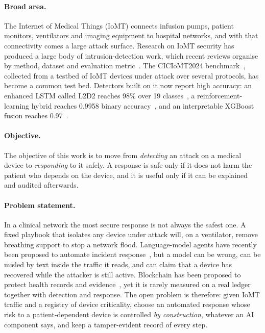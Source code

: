 \documentclass[preprint,12pt]{elsarticle}
\begin{document}
\paragraph{Broad area.}
The Internet of Medical Things (IoMT) connects infusion pumps, patient monitors, ventilators and imaging equipment to hospital networks, and with that connectivity comes a large attack surface. Research on IoMT security has produced a large body of intrusion-detection work, which recent reviews organise by method, dataset and evaluation metric~\cite{naghib2025}. The CICIoMT2024 benchmark~\cite{dadkhah2024}, collected from a testbed of IoMT devices under attack over several protocols, has become a common test bed. Detectors built on it now report high accuracy: an enhanced LSTM called L2D2 reaches 98\% over 19 classes~\cite{akar2025}, a reinforcement-learning hybrid reaches 0.9958 binary accuracy~\cite{shaikh2025}, and an interpretable XGBoost fusion reaches 0.97~\cite{hafid2025}.

\paragraph{Objective.}
The objective of this work is to move from \emph{detecting} an attack on a medical device to \emph{responding} to it safely. A response is safe only if it does not harm the patient who depends on the device, and it is useful only if it can be explained and audited afterwards.

\paragraph{Problem statement.}
In a clinical network the most secure response is not always the safest one. A fixed playbook that isolates any device under attack will, on a ventilator, remove breathing support to stop a network flood. Language-model agents have recently been proposed to automate incident response~\cite{lin2025,gao2026}, but a model can be wrong, can be misled by text inside the traffic it reads, and can claim that a device has recovered while the attacker is still active. Blockchain has been proposed to protect health records and evidence~\cite{hasnain2023,pelekoudas2023}, yet it is rarely measured on a real ledger together with detection and response. The open problem is therefore: given IoMT traffic and a registry of device criticality, choose an automated response whose risk to a patient-dependent device is controlled \emph{by construction}, whatever an AI component says, and keep a tamper-evident record of every step.
\end{document}
